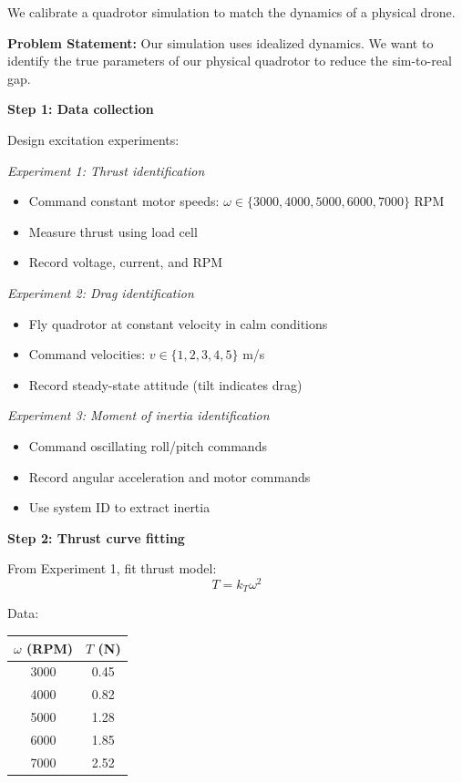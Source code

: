 \begin{example}
\label{ex:calibrating_simulation}
We calibrate a quadrotor simulation to match the dynamics of a physical drone.

\textbf{Problem Statement:}
Our simulation uses idealized dynamics. We want to identify the true parameters of our physical quadrotor to reduce the sim-to-real gap.

\textbf{Step 1: Data collection}

Design excitation experiments:

\textit{Experiment 1: Thrust identification}
\begin{itemize}
    \item Command constant motor speeds: $\omega \in \{3000, 4000, 5000, 6000, 7000\}$ RPM
    \item Measure thrust using load cell
    \item Record voltage, current, and RPM
\end{itemize}

\textit{Experiment 2: Drag identification}
\begin{itemize}
    \item Fly quadrotor at constant velocity in calm conditions
    \item Command velocities: $v \in \{1, 2, 3, 4, 5\}$ m/s
    \item Record steady-state attitude (tilt indicates drag)
\end{itemize}

\textit{Experiment 3: Moment of inertia identification}
\begin{itemize}
    \item Command oscillating roll/pitch commands
    \item Record angular acceleration and motor commands
    \item Use system ID to extract inertia
\end{itemize}

\textbf{Step 2: Thrust curve fitting}

From Experiment 1, fit thrust model:
\begin{equation}
T = k_T \omega^2
\end{equation}

Data:
\begin{center}
\begin{tabular}{cc}
\toprule
$\omega$ (RPM) & $T$ (N) \\
\midrule
3000 & 0.45 \\
4000 & 0.82 \\
5000 & 1.28 \\
6000 & 1.85 \\
7000 & 2.52 \\
\bottomrule
\end{tabular}
\end{center}


\end{example}
